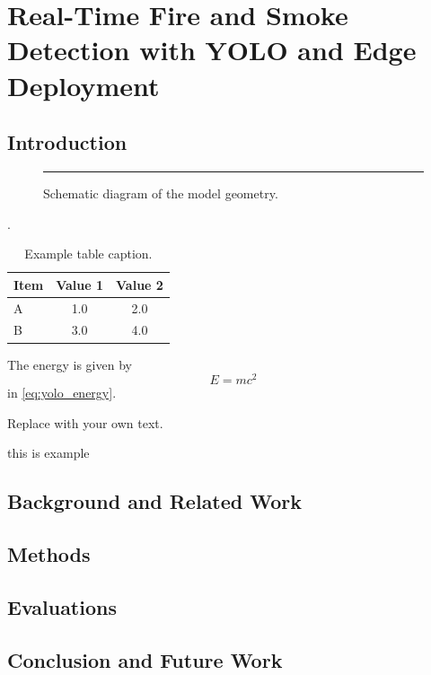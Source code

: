 \section{Real-Time Fire and Smoke Detection with YOLO and Edge Deployment}

\subsection{Introduction}

\begin{figure}[htbp]
  \centering
  \rule{0.7\textwidth}{3cm}   %
  \caption{Schematic diagram of the model geometry.}
  \label{fig:yolo_geometry}
\end{figure}

\order.

\begin{table}[htbp]
  \centering
  \caption{Example table caption.}
  \begin{tabular}{@{}lcc@{}}
    \toprule
    Item & Value 1 & Value 2 \\
    \midrule
    A & 1.0 & 2.0 \\
    B & 3.0 & 4.0 \\
    \bottomrule
  \end{tabular}
  \label{tab:yolo_example}
\end{table}

The energy is given by
\begin{equation}
  E = mc^{2}
  \label{eq:yolo_energy}
\end{equation}
in \eqref{eq:yolo_energy}.

Replace with your own text.

this is example~\cite{dirac1931}

\subsection{Background and Related Work}
\subsection{Methods}
\subsection{Evaluations}
\subsection{Conclusion and Future Work}